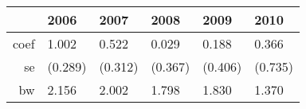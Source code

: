 \begin{table}[ht]
\centering
\begin{tabular}{rlllll}
  \hline
 & 2006 & 2007 & 2008 & 2009 & 2010 \\ 
  \hline
coef & 1.002 & 0.522 & 0.029 & 0.188 & 0.366 \\ 
  se & (0.289) & (0.312) & (0.367) & (0.406) & (0.735) \\ 
  bw & 2.156 & 2.002 & 1.798 & 1.830 & 1.370 \\ 
   \hline
\end{tabular}
\end{table}
